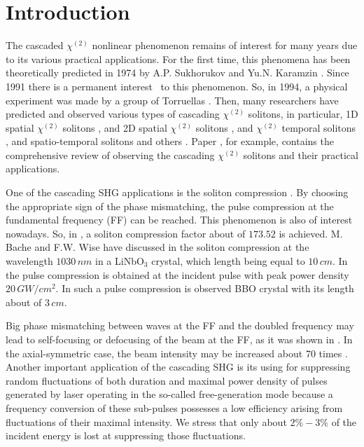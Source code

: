 \documentclass[a4paper, 12pt, onecolumn]{extarticle}
\begin{document}
\section*{Introduction}
The cascaded \(\chi^{(2)}\) nonlinear phenomenon remains of interest for many years due to its various practical applications. For the first time, this phenomena has been theoretically predicted in 1974 by A.P. Sukhorukov and Yu.N. Karamzin \cite{bib:n1}. Since 1991 there is a permanent interest \ to this phenomenon. So, in 1994, a physical experiment was made by a group of Torruellas \cite{bib:n2}. Then, many researchers have predicted and observed various types of cascading \(\chi^{(2)}\) solitons, in particular, 1D spatial \(\chi^{(2)}\) solitons \cite{bib:n3}, and 2D spatial \(\chi^{(2)}\) solitons \cite{bib:n2, bib:n4, bib:n5}, and \(\chi^{(2)}\) temporal solitons \cite{bib:n6}, and spatio-temporal solitons\cite{bib:n7} and others \cite{bib:n9,bib:n10}. Paper \cite{bib:n8}, for example, contains the comprehensive review of observing the cascading \(\chi^{(2)}\) solitons and their practical applications. 

One of the cascading SHG applications is the soliton compression \cite{bib:n11, bib:n12, bib:n13, bib:n14, bib:n15, bib:n16, bib:n17, bib:n18}. By choosing the appropriate sign of the phase mismatching, the pulse compression at the fundamental frequency (FF) can be reached. This phenomenon is also of interest nowadays. So, in \cite{bib:n11}, a soliton compression factor about of \(173.52\) is achieved. M. Bache and F.W. Wise have discussed in \cite{bib:n12} the soliton compression at the wavelength \(1030\,nm\) in a LiNbO$_3$ crystal, which length being equal to \(10\,cm\). In \cite{bib:n13} the pulse compression is obtained at the incident pulse with peak power density \(20\,GW/cm^2\). In \cite{bib:n14} such a pulse compression is observed BBO crystal with its length about of \(3\,cm\). 


Big phase mismatching between waves at the FF and the doubled frequency may lead to self-focusing or defocusing of the beam at the FF, as it was shown in \cite{bib:n19}. In the axial-symmetric case, the beam intensity may be increased about 70 times \cite{bib:n20}. Another important application of the cascading SHG is its using for suppressing random fluctuations of both duration and  maximal power density of pulses generated by  laser operating in the so-called free-generation mode \cite{bib:n21,bib:n22,bib:n23a,bib:n23}  because a frequency conversion of these sub-pulses possesses a low efficiency arising from fluctuations of their maximal intensity. We stress that only about \(2\%-3\%\) of the incident energy is lost  at suppressing those fluctuations.
\end{document}

